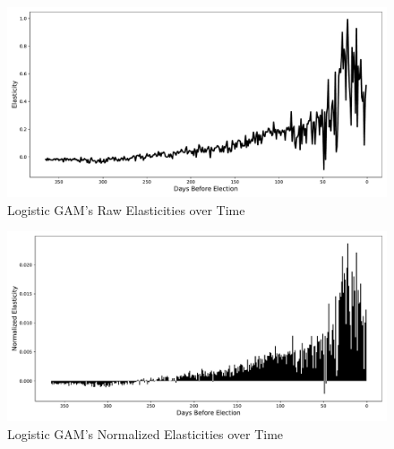 \begin{figure}[H]
	\centering
	\includegraphics[width=0.8\linewidth]{../Figures/gam_elasticity_over_time.pdf}
	\caption{Logistic GAM's Raw Elasticities over Time}
	\label{fig:gam-log-e-time}
\end{figure}

\begin{figure}[H]
	\centering
	\includegraphics[width=0.8\linewidth]{../Figures/gam_norm_elast_over_time.pdf}
	\caption{Logistic GAM's Normalized Elasticities over Time}
	\label{fig:gam-log-norm-e-time}
\end{figure}



\newpage
